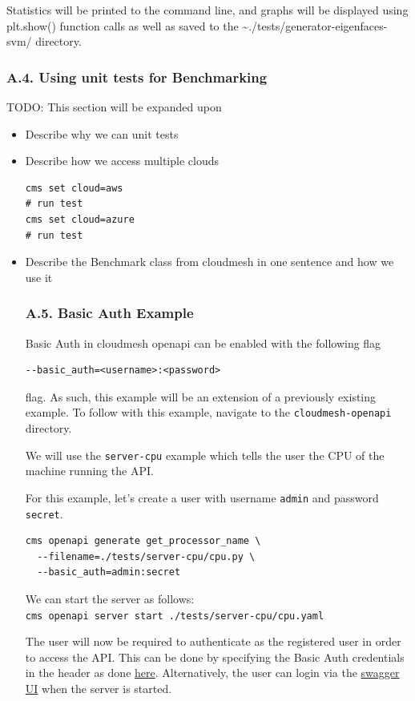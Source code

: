 Statistics will be printed to the command line, and graphs will be
displayed using plt.show() function calls as well as saved to the
\textasciitilde./tests/generator-eigenfaces-svm/ directory.

\hypertarget{a.4.-using-unit-tests-for-benchmarking}{%
\subsubsection{A.4. Using unit tests for
Benchmarking}\label{a.4.-using-unit-tests-for-benchmarking}}

TODO: This section will be expanded upon

\begin{itemize}
\item
  Describe why we can unit tests
\item
  Describe how we access multiple clouds

\begin{verbatim}
cms set cloud=aws
# run test
cms set cloud=azure
# run test
\end{verbatim}
\item
  Describe the Benchmark class from cloudmesh in one sentence and how we
  use it

  \hypertarget{a.5.-basic-auth-example}{%
  \subsubsection{A.5. Basic Auth
  Example}\label{a.5.-basic-auth-example}}

  Basic Auth in cloudmesh openapi can be enabled with the following flag

\begin{verbatim}
--basic_auth=<username>:<password>
\end{verbatim}

  flag. As such, this example will be an extension of a previously
  existing example. To follow with this example, navigate to the
  \texttt{cloudmesh-openapi} directory.

  We will use the \texttt{server-cpu} example which tells the user the
  CPU of the machine running the API.

  For this example, let's create a user with username \texttt{admin} and
  password \texttt{secret}.

\begin{verbatim}
cms openapi generate get_processor_name \
  --filename=./tests/server-cpu/cpu.py \
  --basic_auth=admin:secret
\end{verbatim}

  We can start the server as follows:
  \texttt{cms\ openapi\ server\ start\ ./tests/server-cpu/cpu.yaml}

  The user will now be required to authenticate as the registered user
  in order to access the API. This can be done by specifying the Basic
  Auth credentials in the header as done
  \href{https://developer.mozilla.org/en-US/docs/Web/HTTP/Headers/Authorization}{here}.
  Alternatively, the user can login via the
  \href{http://localhost:8080/cloudmesh/u}{swagger UI} when the server
  is started.
\end{itemize}

